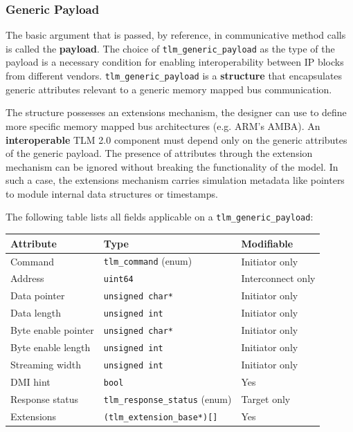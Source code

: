 \documentclass[11pt]{article}
\begin{document}
\subsubsection{Generic Payload}
\label{sec:org03335a6}
The basic argument that is passed, by reference, in communicative method calls is called the \textbf{payload}.
The choice of \texttt{tlm\_generic\_payload} as the type of the payload is a necessary condition for enabling interoperability between IP blocks from different vendors.
\texttt{tlm\_generic\_payload} is a \textbf{structure} that encapsulates generic attributes relevant to a generic memory mapped bus communication.

The structure possesses an extensions mechanism, the designer can use to define more specific memory mapped bus architectures (e.g. ARM's AMBA).
An \textbf{interoperable} TLM 2.0 component must depend only on the generic attributes of the generic payload.
The presence of attributes through the extension mechanism can be ignored without breaking the functionality of the model.
In such a case, the extensions mechanism carries simulation metadata like pointers to module internal data structures or timestamps.

The following table lists all fields applicable on a \texttt{tlm\_generic\_payload}:

\begin{center}
\begin{tabular}{lll}
Attribute & Type & Modifiable\\
\hline
Command & \texttt{tlm\_command} (enum) & Initiator only\\
Address & \texttt{uint64} & Interconnect only\\
Data pointer & \texttt{unsigned char*} & Initiator only\\
Data length & \texttt{unsigned int} & Initiator only\\
Byte enable pointer & \texttt{unsigned char*} & Initiator only\\
Byte enable length & \texttt{unsigned int} & Initiator only\\
Streaming width & \texttt{unsigned int} & Initiator only\\
DMI hint & \texttt{bool} & Yes\\
Response status & \texttt{tlm\_response\_status} (enum) & Target only\\
Extensions & \texttt{(tlm\_extension\_base*)[]} & Yes\\
\end{tabular}
\end{center}
\end{document}
